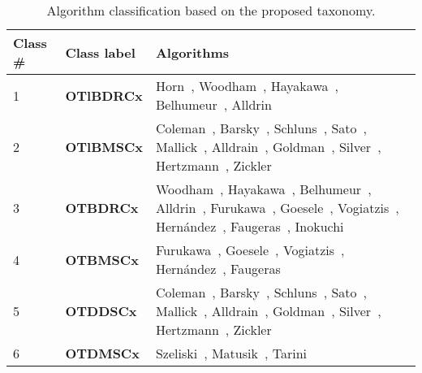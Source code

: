 \begin{table}[!htbp]
  \centering
  \begin{tabular}{l|l|p{10cm}}
  \toprule
  \textbf{Class \#} & Class label & Algorithms\\
  \midrule
  1 & \textbf{OTlBDRCx} & Horn~\cite{horn1970shape}, Woodham~\cite{woodham1980photometric}, Hayakawa~\cite{hayakawa1994photometric}, Belhumeur~\cite{belhumeur1999bas}, Alldrin~\cite{alldrin2007resolving}\\
  2 & \textbf{OTlBMSCx} & Coleman~\cite{coleman1982obtaining}, Barsky~\cite{barsky20034}, Schluns~\cite{schluns1993photometric}, Sato~\cite{sato1994temporal}, Mallick~\cite{mallick2005beyond}, Alldrain~\cite{alldrin2008photometric}, Goldman~\cite{goldman2010shape}, Silver~\cite{silver1980determining}, Hertzmann~\cite{hertzmann2005example}, Zickler~\cite{zickler2002helmholtz}\\
  3 & \textbf{OTBDRCx} & Woodham~\cite{woodham1980photometric}, Hayakawa~\cite{hayakawa1994photometric}, Belhumeur~\cite{belhumeur1999bas}, Alldrin~\cite{alldrin2007resolving}, Furukawa~\cite{furukawa2010accurate}, Goesele~\cite{goesele2006multi}, Vogiatzis~\cite{vogiatzis2007multiview}, Hern{\'a}ndez~\cite{esteban2004silhouette}, Faugeras~\cite{faugeras2002variational}, Inokuchi~\cite{inokuchi1984range}\\
  4 & \textbf{OTBMSCx} & Furukawa~\cite{furukawa2010accurate}, Goesele~\cite{goesele2006multi}, Vogiatzis~\cite{vogiatzis2007multiview}, Hern{\'a}ndez~\cite{esteban2004silhouette}, Faugeras~\cite{faugeras2002variational}\\
  5 & \textbf{OTDDSCx} & Coleman~\cite{coleman1982obtaining}, Barsky~\cite{barsky20034}, Schluns~\cite{schluns1993photometric}, Sato~\cite{sato1994temporal}, Mallick~\cite{mallick2005beyond}, Alldrain~\cite{alldrin2008photometric}, Goldman~\cite{goldman2010shape}, Silver~\cite{silver1980determining}, Hertzmann~\cite{hertzmann2005example}, Zickler~\cite{zickler2002helmholtz}\\
  6 & \textbf{OTDMSCx} & Szeliski~\cite{szeliski1993rapid}, Matusik~\cite{matusik2002efficient}, Tarini~\cite{tarini2002marching}\\
  \bottomrule
  \end{tabular}
  \caption{Algorithm classification based on the proposed taxonomy.}
  \label{tab:algo_taxo}
\end{table}